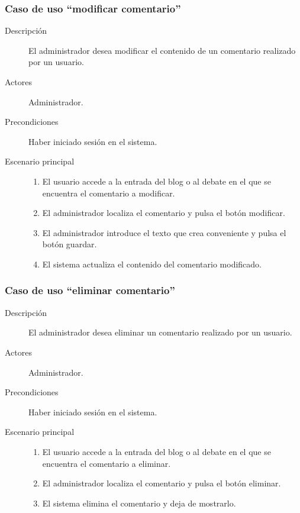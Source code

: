 \subsubsection{Caso de uso ``modificar comentario''}
\begin{description}
\item[Descripción] El administrador desea modificar el contenido de un comentario realizado por un usuario.
\item[Actores] Administrador.
\item[Precondiciones] Haber iniciado sesión en el sistema.
\item[Escenario principal] \hfill
						 	\begin{enumerate}
							\item El usuario accede a la entrada del blog o al debate en el que se encuentra el comentario a modificar.
							\item El administrador localiza el comentario y pulsa el botón modificar.
							\item El administrador introduce el texto que crea conveniente y pulsa el botón guardar.
							\item El sistema actualiza el contenido del comentario modificado.
							\end{enumerate}
\end{description}


\subsubsection{Caso de uso ``eliminar comentario''}
\begin{description}
\item[Descripción] El administrador desea eliminar un comentario realizado por un usuario.
\item[Actores] Administrador.
\item[Precondiciones] Haber iniciado sesión en el sistema.
\item[Escenario principal] \hfill
						 	\begin{enumerate}
							\item El usuario accede a la entrada del blog o al debate en el que se encuentra el comentario a eliminar.
							\item El administrador localiza el comentario y pulsa el botón eliminar.
							\item El sistema elimina el comentario y deja de mostrarlo.
							\end{enumerate}
\end{description}